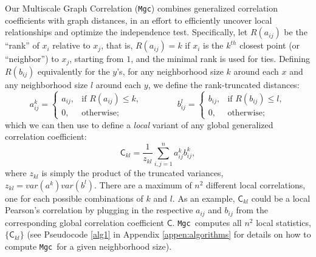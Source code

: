 \documentclass[11pt]{article}
\newcommand{\note}[2][]{\added[#1,remark={#2}]{}}
\providecommand{\sct}[1]{{\sc \texttt{#1}}}
\newcommand{\G}{\mathsf{C}}
\newcommand{\Mgc}{\sct{Mgc}}
\newcommand{\cs}[1]{{\note{cs: #1}}}
\begin{document}
Our Multiscale Graph Correlation (\Mgc) combines generalized correlation coefficients with  graph distances, in an effort to efficiently uncover local relationships and optimize the independence test.  Specifically, let $R(a_{ij})$  be the ``rank'' of $x_i$ relative to $x_j$, that is, $R(a_{ij})=k$ if $x_i$ is the $k^{th}$ closest point (or ``neighbor'') to $x_j$, starting from $1$, and the minimal rank is used for ties.  Defining $R(b_{ij})$ equivalently for the $y$'s, for any neighborhood size $k$ around each $x$ and any neighborhood size $l$ around each $y$, 
we define the rank-truncated distances:
\begin{equation}
\label{localCoef2}
    a_{ij}^k=
    \begin{cases}
      a_{ij}, & \text{if } R(a_{ij}) \leq k, \\
      0, & \text{otherwise};
    \end{cases} \qquad \qquad
    b_{ij}^l=
    \begin{cases}
      b_{ij}, & \text{if } R(b_{ij}) \leq l, \\
      0, & \text{otherwise};
    \end{cases}
\end{equation}
which we can then use to define  a \emph{local} variant of any global generalized correlation coefficient:
\begin{equation}
\label{localCoef}
\G_{kl}=\dfrac{1}{z_{kl}} \textstyle \sum_{i,j=1}^n a_{ij}^k b_{ij}^k,
\end{equation}
where $z_{kl}$ is simply the product of the truncated variances, $z_{kl}=var(a^k) var(b^l)$. There are a maximum of  $n^2$ different local correlations, one for each possible combinations of $k$ and $l$.
As an example, $\G_{kl}$ could be a local Pearson's correlation by plugging in the respective $a_{ij}$ and $b_{ij}$ from the corresponding global correlation coefficient $\G$. 
\cs{i took this out, it is a technical detail ``$\max(R(a_{ij})) \times \max(R(a_{ij}))$ local correlations, which equals $n^2$ when there exists no repeating point in the data.''}
\Mgc~computes all $n^2$ local statistics, $\{\G_{kl}\}$ (see Pseudocode \ref{alg1} in Appendix \ref{appen:algorithms} for details on how to compute \Mgc~for a given neighborhood size).
\end{document}
